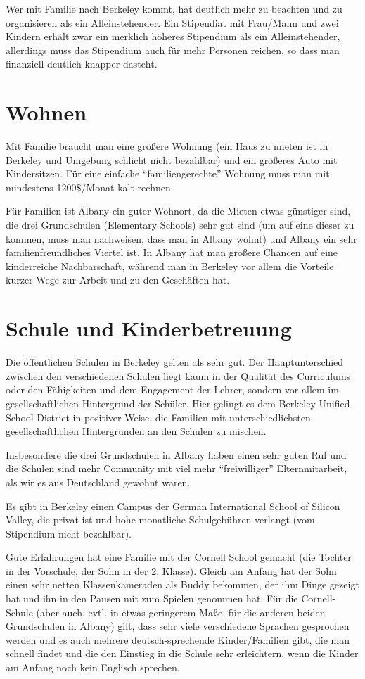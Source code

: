 \documentclass[a4paper]{scrreprt}
\begin{document}
Wer mit Familie nach Berkeley kommt, hat deutlich mehr zu beachten und zu organisieren als ein Alleinstehender. Ein Stipendiat mit Frau/Mann und zwei Kindern erhält zwar ein merklich höheres Stipendium als ein Alleinstehender, allerdings muss das Stipendium auch für mehr Personen reichen, so dass man finanziell deutlich knapper dasteht.


\section{Wohnen}

Mit Familie braucht man eine größere Wohnung (ein Haus zu mieten ist in Berkeley und Umgebung schlicht nicht bezahlbar) und ein größeres Auto mit Kindersitzen. Für eine einfache "`familiengerechte"' Wohnung muss man mit  mindestens 1200\$/Monat kalt rechnen.

Für Familien ist Albany ein guter Wohnort, da die Mieten etwas günstiger sind, die drei Grundschulen (Elementary Schools) sehr gut sind (um auf eine dieser zu kommen, muss man nachweisen, dass man in Albany wohnt) und Albany ein sehr familienfreundliches Viertel ist. In Albany hat man größere Chancen auf eine kinderreiche Nachbarschaft, während man in Berkeley vor allem die Vorteile kurzer Wege zur Arbeit und zu den Geschäften hat.


\section{Schule und Kinderbetreuung}

Die öffentlichen Schulen in Berkeley gelten als sehr gut. Der Hauptunterschied zwischen den verschiedenen Schulen liegt kaum in der Qualität des Curriculums oder den Fähigkeiten und dem Engagement der Lehrer, sondern vor allem im gesellschaftlichen Hintergrund der Schüler. Hier gelingt es dem Berkeley Unified School District in positiver Weise, die Familien mit unterschiedlichsten gesellschaftlichen Hintergründen an den Schulen zu mischen.

Insbesondere die drei Grundschulen in Albany haben einen sehr guten Ruf und die Schulen sind mehr Community mit viel mehr "`freiwilliger"' Elternmitarbeit, als wir es aus Deutschland gewohnt waren.

Es gibt in Berkeley einen Campus der German International School of Silicon Valley, die privat ist und hohe monatliche Schulgebühren verlangt (vom Stipendium nicht bezahlbar).

Gute Erfahrungen hat eine Familie mit der Cornell School gemacht (die Tochter in der Vorschule, der Sohn in der 2. Klasse). Gleich am Anfang hat der Sohn einen sehr netten Klassenkameraden als Buddy bekommen, der ihm Dinge gezeigt hat und ihn in den Pausen mit zum Spielen genommen hat. Für die Cornell-Schule (aber auch, evtl. in etwas geringerem Maße, für die anderen beiden Grundschulen in Albany) gilt, dass sehr viele verschiedene Sprachen gesprochen werden und es auch mehrere deutsch-sprechende Kinder/Familien gibt, die man schnell findet und die den Einstieg in die Schule sehr erleichtern, wenn die Kinder am Anfang noch kein Englisch sprechen.
\end{document}
